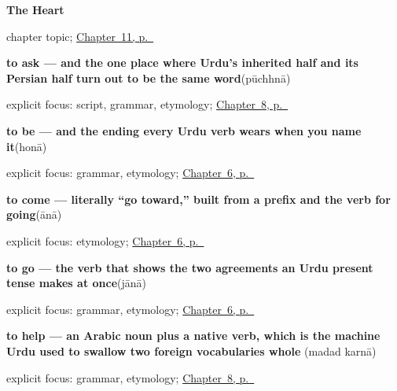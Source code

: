 \noindent\begin{minipage}[t]{\linewidth}
\raggedright
\textbf{The Heart}\par
\footnotesize chapter topic; \hyperref[ch:ur-heart]{Chapter~11, p.~\pageref*{ch:ur-heart}}
\end{minipage}\par\smallskip

\noindent\begin{minipage}[t]{\linewidth}
\raggedright
\textbf{to ask — and the one place where Urdu's inherited half and its Persian half turn out to be the same word}\enspace\emph{}\enspace(pūchhnā)\par
\footnotesize explicit focus: script, grammar, etymology; \hyperref[ch:ur-social-verbs]{Chapter~8, p.~\pageref*{ch:ur-social-verbs}}
\end{minipage}\par\smallskip

\noindent\begin{minipage}[t]{\linewidth}
\raggedright
\textbf{to be — and the ending every Urdu verb wears when you name it}\enspace\emph{}\enspace(honā)\par
\footnotesize explicit focus: grammar, etymology; \hyperref[ch:ur-core-verbs]{Chapter~6, p.~\pageref*{ch:ur-core-verbs}}
\end{minipage}\par\smallskip

\noindent\begin{minipage}[t]{\linewidth}
\raggedright
\textbf{to come — literally “go toward,” built from a prefix and the verb for going}\enspace\emph{}\enspace(ānā)\par
\footnotesize explicit focus: etymology; \hyperref[ch:ur-core-verbs]{Chapter~6, p.~\pageref*{ch:ur-core-verbs}}
\end{minipage}\par\smallskip

\noindent\begin{minipage}[t]{\linewidth}
\raggedright
\textbf{to go — the verb that shows the two agreements an Urdu present tense makes at once}\enspace\emph{}\enspace(jānā)\par
\footnotesize explicit focus: grammar, etymology; \hyperref[ch:ur-core-verbs]{Chapter~6, p.~\pageref*{ch:ur-core-verbs}}
\end{minipage}\par\smallskip

\noindent\begin{minipage}[t]{\linewidth}
\raggedright
\textbf{to help — an Arabic noun plus a native verb, which is the machine Urdu used to swallow two foreign vocabularies whole}\enspace\emph{ }\enspace(madad karnā)\par
\footnotesize explicit focus: grammar, etymology; \hyperref[ch:ur-social-verbs]{Chapter~8, p.~\pageref*{ch:ur-social-verbs}}
\end{minipage}\par\smallskip

